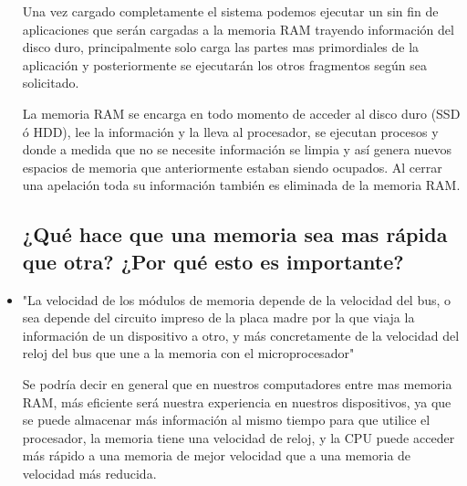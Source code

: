 \begin{itemize}
    Una vez cargado completamente el sistema podemos ejecutar un sin fin de aplicaciones que serán cargadas a la memoria RAM trayendo información del disco duro, principalmente solo carga las partes mas primordiales de la aplicación y posteriormente se ejecutarán los otros fragmentos según sea solicitado.
    
    La memoria RAM se encarga en todo momento de acceder al disco duro (SSD ó HDD), lee la información y la lleva al procesador, se ejecutan procesos y donde a medida que no se necesite información se limpia y así genera nuevos espacios de memoria que anteriormente estaban siendo ocupados. Al cerrar una apelación toda su información también es eliminada de la memoria RAM.
    
    
    \subsection{ ¿Qué hace que una memoria sea mas rápida que otra? ¿Por qué esto es importante?}
    \item "La velocidad de los módulos de memoria depende de la velocidad del bus, o sea depende del circuito impreso de la placa madre por la que viaja la información de un dispositivo a otro, y más concretamente de la velocidad del reloj del bus que une a la memoria con el microprocesador"\cite{YouBioit}
    
    Se podría decir en general que en nuestros computadores entre mas memoria RAM, más eficiente será nuestra experiencia en nuestros dispositivos, ya que se puede almacenar más información al mismo tiempo para que utilice el procesador, la memoria tiene una velocidad de reloj, y la CPU puede acceder más rápido a una memoria de mejor velocidad que a una memoria de velocidad más reducida.
    
\end{itemize}